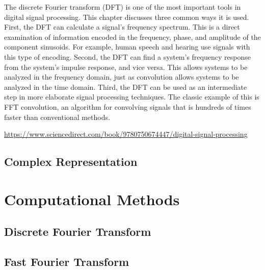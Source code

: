 \documentclass[ams,fleqn,amsmath,amssymb]{article}
\begin{document}
The discrete Fourier transform (DFT) is one of the most important tools in digital signal processing. This chapter discusses three common ways it is used. First, the DFT can calculate a signal's frequency spectrum. This is a direct examination of information encoded in the frequency, phase, and amplitude of the component sinusoids. For example, human speech and hearing use signals with this type of encoding. Second, the DFT can find a system's frequency response from the system's impulse response, and vice versa. This allows systems to be analyzed in the frequency domain, just as convolution allows systems to be analyzed in the time domain. Third, the DFT can be used as an intermediate step in more elaborate signal processing techniques. The classic example of this is FFT convolution, an algorithm for convolving signals that is hundreds of times faster than conventional methods.

\url{https://www.sciencedirect.com/book/9780750674447/digital-signal-processing}

\subsection{Complex Representation}

\section{Computational Methods}

\subsection{Discrete Fourier Transform}

\subsection{Fast Fourier Transform}
\end{document}
